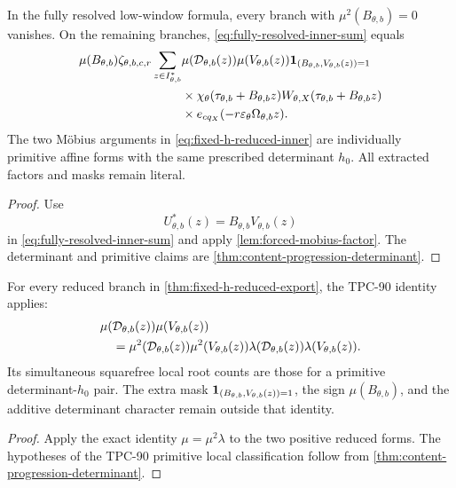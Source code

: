 \begin{theorem}
\label{thm:fixed-h-reduced-export}
In the fully resolved low-window formula, every branch with
\(\mu^2(B_{\theta,b})=0\) vanishes.  On the remaining branches,
\eqref{eq:fully-resolved-inner-sum} equals
\begin{align}
 \mu(B_{\theta,b})\zeta_{\theta,b,c,r}
 \sum_{z\in I_{\theta,b}^\ast}
 &\mu(\mathcal D_{\theta,b}(z))
 \mu(V_{\theta,b}(z))
 \mathbf 1_{(B_{\theta,b},V_{\theta,b}(z))=1}
\notag\\
 &\times
 \chi_\theta(\tau_{\theta,b}+B_{\theta,b}z)
 W_{\theta,X}(\tau_{\theta,b}+B_{\theta,b}z)
 \notag\\
 &\times
 e_{cq_X}(-r\varepsilon_\theta\Omega_{\theta,b}z).
\label{eq:fixed-h-reduced-inner}
\end{align}
The two M\"obius arguments in
\eqref{eq:fixed-h-reduced-inner} are individually primitive affine
forms with the same prescribed determinant \(h_0\).  All extracted
factors and masks remain literal.
\end{theorem}

\begin{proof}
Use
\[
 U_{\theta,b}^\ast(z)
 =
 B_{\theta,b}V_{\theta,b}(z)
\]
in \eqref{eq:fully-resolved-inner-sum} and apply
\cref{lem:forced-mobius-factor}.  The determinant and primitive
claims are \cref{thm:content-progression-determinant}.
\end{proof}

\begin{corollary}
\label{cor:tpc90-after-extraction}
For every reduced branch in
\cref{thm:fixed-h-reduced-export}, the TPC-90 identity applies:
\begin{align}
 &\mu(\mathcal D_{\theta,b}(z))
 \mu(V_{\theta,b}(z))
\notag\\
 &\quad=
 \mu^2(\mathcal D_{\theta,b}(z))
 \mu^2(V_{\theta,b}(z))
 \lambda(\mathcal D_{\theta,b}(z))
 \lambda(V_{\theta,b}(z)).
\label{eq:tpc90-reduced-split}
\end{align}
Its simultaneous squarefree local root counts are those for a
primitive determinant-\(h_0\) pair.  The extra mask
\(\mathbf 1_{(B_{\theta,b},V_{\theta,b}(z))=1}\), the sign
\(\mu(B_{\theta,b})\), and the additive determinant character remain
outside that identity.
\end{corollary}

\begin{proof}
Apply the exact identity \(\mu=\mu^2\lambda\) to the two positive
reduced forms.  The hypotheses of the TPC-90 primitive local
classification follow from
\cref{thm:content-progression-determinant}.
\end{proof}

